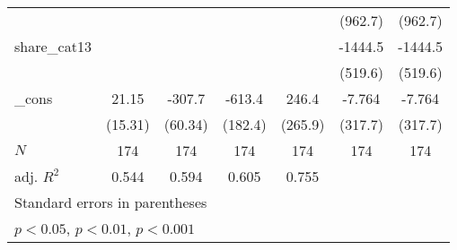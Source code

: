 {\begin{tabular}{l*{6}{c}}
            &                     &                     &                     &                     &     (962.7)         &     (962.7)         \\
[1em]
share\_cat13 &                     &                     &                     &                     &     -1444.5\sym{**} &     -1444.5\sym{**} \\
            &                     &                     &                     &                     &     (519.6)         &     (519.6)         \\
[1em]
\_cons      &       21.15         &      -307.7\sym{***}&      -613.4\sym{***}&       246.4         &      -7.764         &      -7.764         \\
            &     (15.31)         &     (60.34)         &     (182.4)         &     (265.9)         &     (317.7)         &     (317.7)         \\
\hline
\(N\)       &         174         &         174         &         174         &         174         &         174         &         174         \\
adj. \(R^{2}\)&       0.544         &       0.594         &       0.605         &       0.755         &                     &                     \\
\hline\hline
\multicolumn{7}{l}{\footnotesize Standard errors in parentheses}\\
\multicolumn{7}{l}{\footnotesize \sym{*} \(p<0.05\), \sym{**} \(p<0.01\), \sym{***} \(p<0.001\)}\\
\end{tabular}
}
